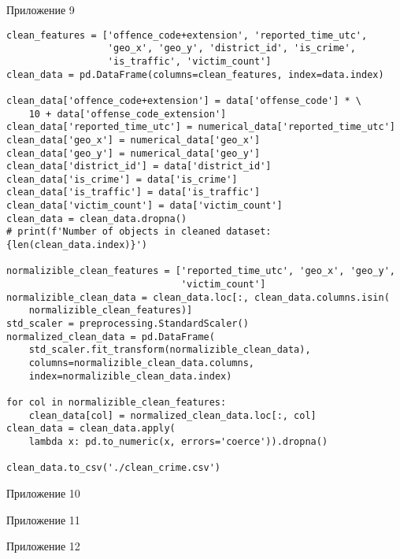 \newpage
{}
Приложение 9
\begin{codeappendix}
\begin{verbatim}
clean_features = ['offence_code+extension', 'reported_time_utc',
                  'geo_x', 'geo_y', 'district_id', 'is_crime',
                  'is_traffic', 'victim_count']
clean_data = pd.DataFrame(columns=clean_features, index=data.index)

clean_data['offence_code+extension'] = data['offense_code'] * \
    10 + data['offense_code_extension']
clean_data['reported_time_utc'] = numerical_data['reported_time_utc']
clean_data['geo_x'] = numerical_data['geo_x']
clean_data['geo_y'] = numerical_data['geo_y']
clean_data['district_id'] = data['district_id']
clean_data['is_crime'] = data['is_crime']
clean_data['is_traffic'] = data['is_traffic']
clean_data['victim_count'] = data['victim_count']
clean_data = clean_data.dropna()
# print(f'Number of objects in cleaned dataset: {len(clean_data.index)}')

normalizible_clean_features = ['reported_time_utc', 'geo_x', 'geo_y',
                               'victim_count']
normalizible_clean_data = clean_data.loc[:, clean_data.columns.isin(
    normalizible_clean_features)]
std_scaler = preprocessing.StandardScaler()
normalized_clean_data = pd.DataFrame(
    std_scaler.fit_transform(normalizible_clean_data),
    columns=normalizible_clean_data.columns,
    index=normalizible_clean_data.index)

for col in normalizible_clean_features:
    clean_data[col] = normalized_clean_data.loc[:, col]
clean_data = clean_data.apply(
    lambda x: pd.to_numeric(x, errors='coerce')).dropna()

clean_data.to_csv('./clean_crime.csv')
\end{verbatim}
\end{codeappendix}
\label{appendix:9}

\newpage
{}
Приложение 10
\label{appendix:10}

\newpage
{}
Приложение 11
\label{appendix:11}

\newpage
{}
Приложение 12
\label{appendix:12}
